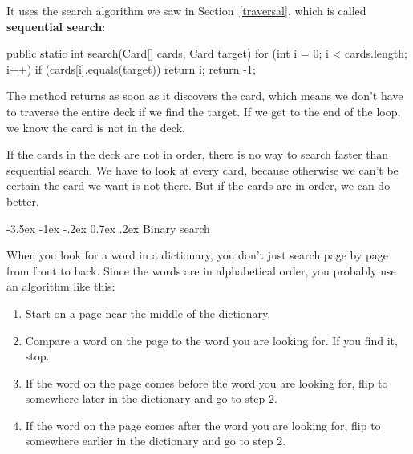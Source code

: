 \documentclass[12pt]{book}
\makeatletter
\theoremstyle{exercise}
\newcommand{\java}[1]{\verb"#1"}
\renewcommand{\section}{\@startsection{section}{1}{\z@}%
    {-3.5ex \@plus -1ex \@minus -.2ex}%
    {0.7ex \@plus.2ex}%
    {\normalfont\Large\bfseries}}
\newcommand{\java}[1]{\lstinline{#1}} %
\makeatother
\begin{document}
It uses the search algorithm we saw in Section~\ref{traversal}, which is called {\bf sequential search}:

\begin{code}
public static int search(Card[] cards, Card target) {
    for (int i = 0; i < cards.length; i++) {
        if (cards[i].equals(target)) {
            return i;
        }
    }
    return -1;
}
\end{code}



The method returns as soon as it discovers the card, which means we don't have to traverse the entire deck if we find the target.
If we get to the end of the loop, we know the card is not in the deck.

If the cards in the deck are not in order, there is no way to search faster than sequential search.
We have to look at every card, because otherwise we can't be certain the card we want is not there.
But if the cards are in order, we can do better.


\section{Binary search}

When you look for a word in a dictionary, you don't just search page by page from front to back.
Since the words are in alphabetical order, you probably use an algorithm like this:

\begin{enumerate}

\item Start on a page near the middle of the dictionary.

\item Compare a word on the page to the word you are looking for.
If you find it, stop.

\item If the word on the page comes before the word you are looking for, flip to somewhere later in the dictionary and go to step 2.

\item If the word on the page comes after the word you are looking for, flip to somewhere earlier in the dictionary and go to step 2.

\end{enumerate}
\end{document}
